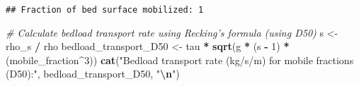 \documentclass[
]{article}
\newenvironment{Shaded}{\begin{snugshade}}{\end{snugshade}}
\newcommand{\CommentTok}[1]{\textcolor[rgb]{0.56,0.35,0.01}{\textit{#1}}}
\newcommand{\DecValTok}[1]{\textcolor[rgb]{0.00,0.00,0.81}{#1}}
\newcommand{\FunctionTok}[1]{\textcolor[rgb]{0.13,0.29,0.53}{\textbf{#1}}}
\newcommand{\NormalTok}[1]{#1}
\newcommand{\OtherTok}[1]{\textcolor[rgb]{0.56,0.35,0.01}{#1}}
\newcommand{\SpecialCharTok}[1]{\textcolor[rgb]{0.81,0.36,0.00}{\textbf{#1}}}
\newcommand{\StringTok}[1]{\textcolor[rgb]{0.31,0.60,0.02}{#1}}
\begin{document}
\begin{verbatim}
## Fraction of bed surface mobilized: 1
\end{verbatim}

\begin{Shaded}
\begin{Highlighting}[]
\CommentTok{\# Calculate bedload transport rate using Recking’s formula (using D50)}
\NormalTok{s }\OtherTok{\textless{}{-}}\NormalTok{ rho\_s }\SpecialCharTok{/}\NormalTok{ rho}
\NormalTok{bedload\_transport\_D50 }\OtherTok{\textless{}{-}}\NormalTok{ tau }\SpecialCharTok{*} \FunctionTok{sqrt}\NormalTok{(g }\SpecialCharTok{*}\NormalTok{ (s }\SpecialCharTok{{-}} \DecValTok{1}\NormalTok{) }\SpecialCharTok{*}\NormalTok{ (mobile\_fraction}\SpecialCharTok{\^{}}\DecValTok{3}\NormalTok{))}
\FunctionTok{cat}\NormalTok{(}\StringTok{"Bedload transport rate (kg/s/m) for mobile fractions (D50):"}\NormalTok{, bedload\_transport\_D50, }\StringTok{"}\SpecialCharTok{\textbackslash{}n}\StringTok{"}\NormalTok{)}
\end{Highlighting}
\end{Shaded}
\end{document}
